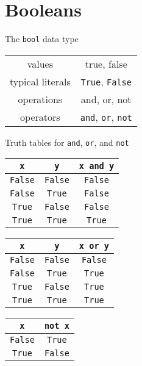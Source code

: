 \documentclass[8pt,a4paper,compress]{beamer}
\begin{document}
\section{Booleans}
\begin{frame}[fragile]
The \lstinline{bool} data type
\begin{center}
\begin{tabular}{c|c}
values & true, false \\ 
typical literals & \lstinline$True$, \lstinline$False$ \\ 
operations & and, or, not \\
operators & \lstinline$and$, \lstinline$or$, \lstinline$not$
\end{tabular} 
\end{center}

\bigskip

Truth tables for \lstinline{and}, \lstinline{or}, and \lstinline{not}
\begin{center}
\begin{tabular}{cc|c}
\lstinline$x$ & \lstinline$y$ & \lstinline$x and y$ \\ \hline
\lstinline$False$ & \lstinline$False$ & \lstinline$False$ \\
\lstinline$False$ & \lstinline$True$ & \lstinline$False$ \\
\lstinline$True$ & \lstinline$False$ & \lstinline$False$ \\
\lstinline$True$ & \lstinline$True$ & \lstinline$True$
\end{tabular}\hspace{1cm} \begin{tabular}{cc|c}
\lstinline$x$ & \lstinline$y$ & \lstinline$x or y$ \\ \hline
\lstinline$False$ & \lstinline$False$ & \lstinline$False$ \\
\lstinline$False$ & \lstinline$True$ & \lstinline$True$ \\
\lstinline$True$ & \lstinline$False$ & \lstinline$True$ \\
\lstinline$True$ & \lstinline$True$ & \lstinline$True$
\end{tabular}\hspace{1cm} \begin{tabular}{c|c}
\lstinline$x$ & \lstinline$not x$ \\ \hline
\lstinline$False$ & \lstinline$True$ \\
\lstinline$True$ & \lstinline$False$
\end{tabular}
\end{center}


\end{frame}
\end{document}
